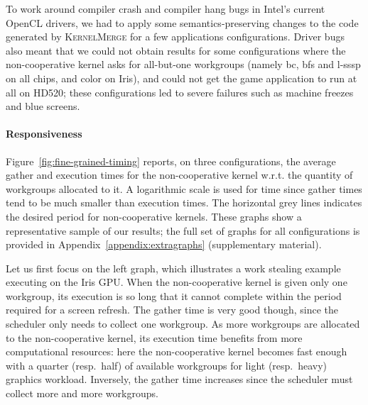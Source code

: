 \documentclass[numbers,nocopyrightspace,10pt]{sigplanconf}
\newcommand{\kernelmerge}{\textsc{KernelMerge}}
\newcommand{\myfiglong}{Figure~}
\begin{document}
To work around compiler crash and compiler hang bugs in Intel's current
OpenCL drivers, we had to apply some semantics-preserving changes to the
code generated by \kernelmerge{} for a few applications configurations.
Driver bugs also meant that we could not obtain results for some configurations where the
non-cooperative kernel asks for all-but-one workgroups (namely bc, bfs
and l-sssp on all chips, and color on Iris), and could not get the game
application to run at all on HD520; these configurations led to
severe failures such as machine freezes and blue screens.


\paragraph{Responsiveness}

\myfiglong\ref{fig:fine-grained-timing} reports, on three
configurations, the average gather and execution times for the non-cooperative
kernel w.r.t. the quantity of workgroups allocated to it.
A logarithmic
scale is used for time since gather times tend to be much smaller than
execution times. The horizontal grey lines indicates the desired period
for non-cooperative kernels.  These graphs show a representative sample of our results; the full set of graphs for all configurations is provided in Appendix~\ref{appendix:extragraphs} (supplementary material).

Let us first focus on the left graph, which illustrates a work stealing
example executing on the Iris GPU.  When the non-cooperative kernel is given only one workgroup, its
execution is so long that it cannot complete within the period required for a screen refresh. The gather time is very good though, since the scheduler
only needs to collect one workgroup. As more workgroups are allocated to
the non-cooperative kernel, its execution time benefits from more computational
resources: here the non-cooperative
kernel becomes fast enough with a quarter (resp.\ half) of available
workgroups for light (resp.\ heavy) graphics workload. Inversely, the
gather time increases since the scheduler must collect more and more
workgroups.
\end{document}
